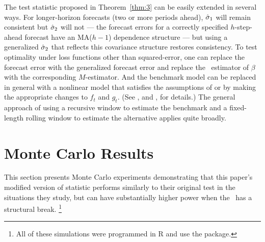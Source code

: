 \documentclass[12pt,fleqn]{article}
\providecommand\phantomsection{}
\begin{document}
\phantomsection
{}
\begin{thm}\label{thm:3}\end{thm}

The test statistic proposed in Theorem~\ref{thm:3} can be easily
extended in several ways. For longer-horizon forecasts (two or more
periods ahead), $\hat\sigma_1$ will remain consistent but $\hat\sigma_2$
will not --- the forecast errors for a correctly specified
$h$-step-ahead forecast have an MA($h-1$) dependence structure --- but
using a generalized $\hat\sigma_2$ that reflects this covariance
structure restores consistency. To test optimality under loss
functions other than squared-error, one can replace the forecast error
with the generalized forecast error \citep[see, for
example][]{PaT:07,PaT:07b} and replace the \ols\ estimator of $\beta$ with the
corresponding $M$-estimator. And the benchmark model can be replaced
in general with a nonlinear model that satisfies the assumptions of
\citet{Wes:96} or \citet{Mcc:00} by making the appropriate changes to
$f_t$ and $g_t$. (See \citealp{Wes:96}, and \citealp{Mcc:00},
for details.) The general approach of using a recursive window to
estimate the benchmark and a fixed-length rolling window to estimate
the alternative applies quite broadly.

\section{Monte Carlo Results}\label{sec:2}
This section presents Monte Carlo experiments demonstrating that
this paper's modified version of  statistic performs
similarly to their original test in the situations they study, but can
have substantially higher power when the \dgp\ has a structural
break.%
\footnote{All of these simulations were programmed in R
  \citep[version 2.14.0]{R} and use the 
  \citep[7.3-22]{VeR:02} package.} %
\end{document}
